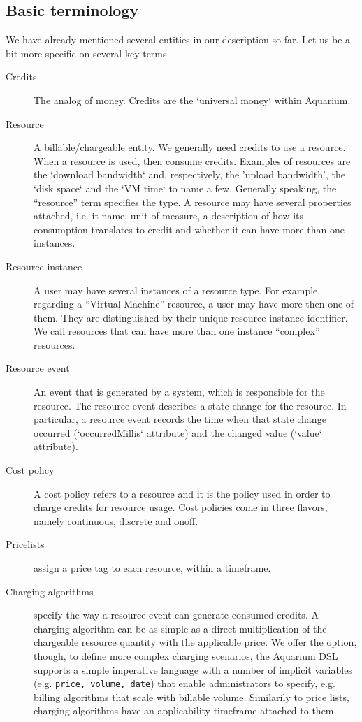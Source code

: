 \documentclass[preprint,10pt]{sigplanconf}
\begin{document}
\subsection{Basic terminology}
We have already mentioned several entities in our description so far. Let us be a bit more specific on several key terms.

\begin{description}
\item[Credits]
The analog of money. Credits are the `universal money` within Aquarium.

\item[Resource]
A billable/chargeable entity. We generally need credits to use a resource. When a resource is used,  then consume credits. Examples of resources are the `download bandwidth` and, respectively,  the 'upload bandwidth', the `disk space` and the `VM time` to name a few. Generally speaking, the ``resource'' term specifies the type. A resource may have several properties attached, i.e. it name, unit of measure, a description of how its consumption translates to credit and whether it can have more than one instances.

\item[Resource instance]
A user may have several instances of a resource type. For example, regarding a ``Virtual Machine'' resource, a user may have more then one of them. They are distinguished by their unique resource instance identifier. We call resources that can have more than one instance ``complex'' resources.

\item[Resource event]
An event that is generated by a system, which is responsible for the resource.
The resource event describes a state change for the resource. In particular, a resource event records the time when that state change occurred (`occurredMillis` attribute) and the changed value (`value` attribute).

\item[Cost policy]
A cost policy refers to a resource and it is the policy used in order to charge credits for resource usage. Cost policies come in three flavors, namely \textsf{continuous}, \textsf{discrete} and \textsf{onoff}.
          
\item[Pricelists] assign a price tag to each resource, within a timeframe.

\item[Charging algorithms] specify the way a resource event can generate consumed credits. 
A charging algorithm can be as simple as a direct multiplication of the 
        chargeable resource quantity with the applicable price. We offer the option, though, to define more complex charging  scenarios, the Aquarium DSL supports a simple imperative language with
        a number of implicit variables (e.g. \texttt{price, volume, date}) 
        that enable administrators to specify, e.g. billing algorithms that
        scale with billable volume. Similarily to price lists, charging algorithms
        have an applicability timeframe attached to them.
        

\end{description}
\end{document}
